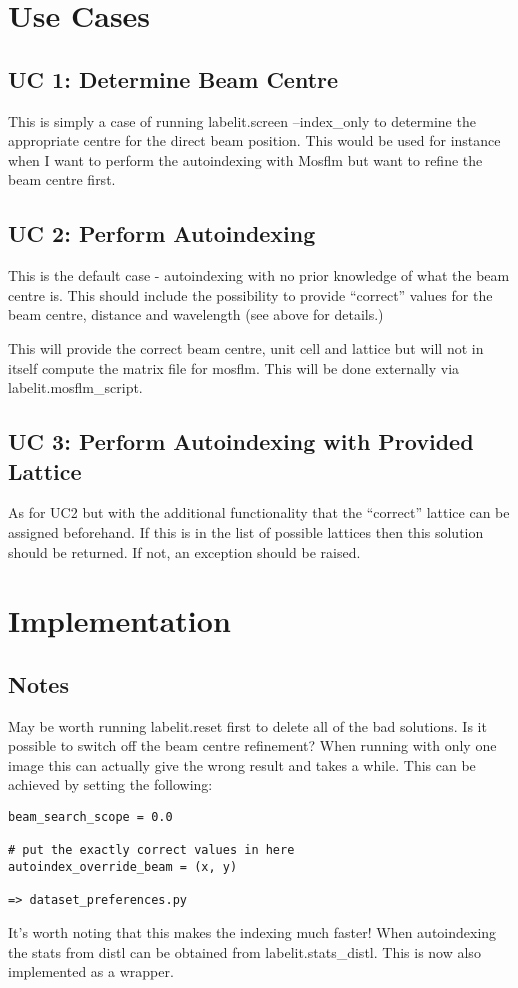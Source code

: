 \documentclass[a4paper, 11pt]{article}
\begin{document}
\section{Use Cases}

\subsection{UC 1: Determine Beam Centre}

This is simply a case of running labelit.screen --index\_only to determine the
appropriate centre for the direct beam position. This would be used for 
instance when I want to perform the autoindexing with Mosflm but want to
refine the beam centre first.

\subsection{UC 2: Perform Autoindexing}

This is the default case - autoindexing with no prior knowledge of what 
the beam centre is. This should include the possibility to provide ``correct''
values for the beam centre, distance and wavelength (see above for details.)

This will provide the correct beam centre, unit cell and lattice but will
not in itself compute the matrix file for mosflm. This will be done externally
via labelit.mosflm\_script.

\subsection{UC 3: Perform Autoindexing with Provided Lattice}

As for UC2 but with the additional functionality that the ``correct'' 
lattice can be assigned beforehand. If this is in the list of possible 
lattices then this solution should be returned. If not, an exception 
should be raised.

\section{Implementation}

\subsection{Notes}

May be worth running labelit.reset first to delete all of the bad solutions.
Is it possible to switch off the beam centre refinement? When running with 
only one image this can actually give the wrong result and takes a while.
This can be achieved by setting the following:

{
\tiny
\begin{verbatim}
beam_search_scope = 0.0

# put the exactly correct values in here
autoindex_override_beam = (x, y) 

=> dataset_preferences.py

\end{verbatim}
}

It's worth noting that this makes the indexing much faster! When autoindexing
the stats from distl can be obtained from labelit.stats\_distl. This is 
now also implemented as a wrapper.
\end{document}
